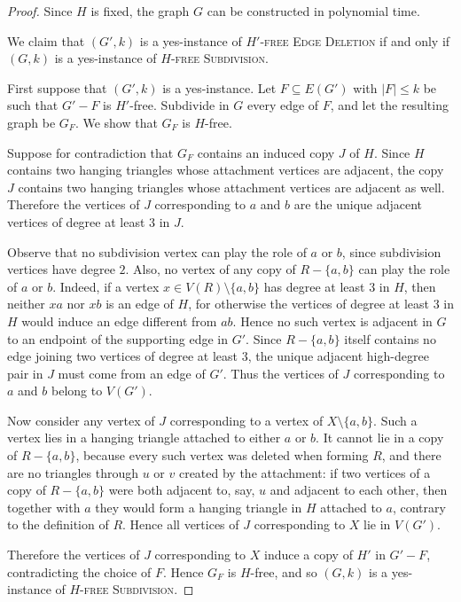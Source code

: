 \documentclass[a4paper,UKenglish,cleveref, autoref, thm-restate]{lipics-v2021}
\begin{document}
\begin{proof}
    Since $H$ is fixed, the graph $G$ can be constructed in polynomial time.

    We claim that $(G',k)$ is a yes-instance of \textsc{$H'$-free Edge Deletion} if and only if $(G,k)$ is a yes-instance of \textsc{$H$-free Subdivision}.

    First suppose that $(G',k)$ is a yes-instance.
    Let $F\subseteq E(G')$ with $|F|\le k$ be such that $G'-F$ is $H'$-free.
    Subdivide in $G$ every edge of $F$, and let the resulting graph be $G_F$.
    We show that $G_F$ is $H$-free.

    Suppose for contradiction that $G_F$ contains an induced copy $J$ of $H$.
    Since $H$ contains two hanging triangles whose attachment vertices are adjacent, the copy $J$ contains two hanging triangles whose attachment vertices are adjacent as well.
    Therefore the vertices of $J$ corresponding to $a$ and $b$ are the unique adjacent vertices of degree at least $3$ in $J$.

    Observe that no subdivision vertex can play the role of $a$ or $b$, since subdivision vertices have degree $2$.
    Also, no vertex of any copy of $R-\{a,b\}$ can play the role of $a$ or $b$.
    Indeed, if a vertex $x\in V(R)\setminus \{a,b\}$ has degree at least $3$ in $H$, then neither $xa$ nor $xb$ is an edge of $H$, for otherwise the vertices of degree at least $3$ in $H$ would induce an edge different from $ab$.
    Hence no such vertex is adjacent in $G$ to an endpoint of the supporting edge in $G'$.
    Since $R-\{a,b\}$ itself contains no edge joining two vertices of degree at least $3$, the unique adjacent high-degree pair in $J$ must come from an edge of $G'$.
    Thus the vertices of $J$ corresponding to $a$ and $b$ belong to $V(G')$.

    Now consider any vertex of $J$ corresponding to a vertex of $X\setminus \{a,b\}$.
    Such a vertex lies in a hanging triangle attached to either $a$ or $b$.
    It cannot lie in a copy of $R-\{a,b\}$, because every such vertex was deleted when forming $R$, and there are no triangles through $u$ or $v$ created by the attachment: if two vertices of a copy of $R-\{a,b\}$ were both adjacent to, say, $u$ and adjacent to each other, then together with $a$ they would form a hanging triangle in $H$ attached to $a$, contrary to the definition of $R$.
    Hence all vertices of $J$ corresponding to $X$ lie in $V(G')$.

    Therefore the vertices of $J$ corresponding to $X$ induce a copy of $H'$ in $G'-F$, contradicting the choice of $F$.
    Hence $G_F$ is $H$-free, and so $(G,k)$ is a yes-instance of \textsc{$H$-free Subdivision}.


\end{proof}
\end{document}
